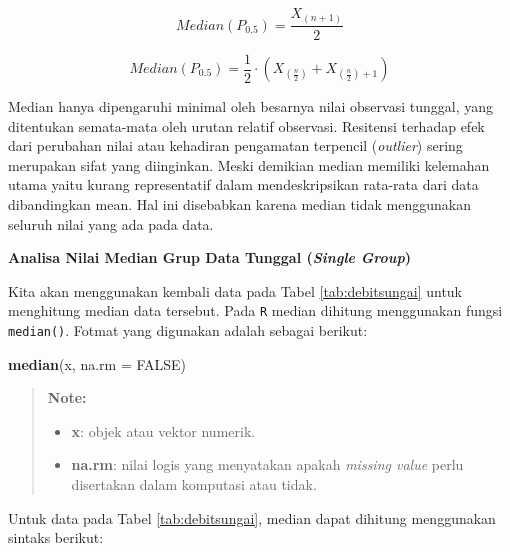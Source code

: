 \documentclass[]{book}
\newenvironment{Shaded}{\begin{snugshade}}{\end{snugshade}}
\newcommand{\KeywordTok}[1]{\textcolor[rgb]{0.13,0.29,0.53}{\textbf{#1}}}
\newcommand{\DataTypeTok}[1]{\textcolor[rgb]{0.13,0.29,0.53}{#1}}
\newcommand{\OtherTok}[1]{\textcolor[rgb]{0.56,0.35,0.01}{#1}}
\newcommand{\OperatorTok}[1]{\textcolor[rgb]{0.81,0.36,0.00}{\textbf{#1}}}
\newcommand{\NormalTok}[1]{#1}
\providecommand{\tightlist}{%
  \setlength{\itemsep}{0pt}\setlength{\parskip}{0pt}}
\begin{document}
\begin{equation}
  Median (P_{0.5}) =\frac{X_{\left(n+1\right)}}{2}
  \label{eq:med1}
\end{equation}

\begin{equation}
  Median (P_{0.5}) =\frac{1}{2}\cdot\left(X_{\left(\frac{n}{2}\right)}+X_{\left(\frac{n}{2}\right)+1}\right)
  \label{eq:med2}
\end{equation}

Median hanya dipengaruhi minimal oleh besarnya nilai observasi tunggal,
yang ditentukan semata-mata oleh urutan relatif observasi. Resitensi
terhadap efek dari perubahan nilai atau kehadiran pengamatan terpencil
(\emph{outlier}) sering merupakan sifat yang diinginkan. Meski demikian
median memiliki kelemahan utama yaitu kurang representatif dalam
mendeskripsikan rata-rata dari data dibandingkan mean. Hal ini
disebabkan karena median tidak menggunakan seluruh nilai yang ada pada
data.

\textbf{Analisa Nilai Median Grup Data Tunggal (\emph{Single Group})}

Kita akan menggunakan kembali data pada Tabel \ref{tab:debitsungai}
untuk menghitung median data tersebut. Pada \texttt{R} median dihitung
menggunakan fungsi \texttt{median()}. Fotmat yang digunakan adalah
sebagai berikut:

\begin{Shaded}
\begin{Highlighting}[]
\KeywordTok{median}\NormalTok{(x, }\DataTypeTok{na.rm =} \OtherTok{FALSE}\NormalTok{)}
\end{Highlighting}
\end{Shaded}

\begin{quote}
\textbf{Note:}

\begin{itemize}
\tightlist
\item
  \textbf{x}: objek atau vektor numerik.
\item
  \textbf{na.rm}: nilai logis yang menyatakan apakah \emph{missing
  value} perlu disertakan dalam komputasi atau tidak.
\end{itemize}
\end{quote}

Untuk data pada Tabel \ref{tab:debitsungai}, median dapat dihitung
menggunakan sintaks berikut:

\begin{Shaded}
\end{Shaded}
\end{document}
